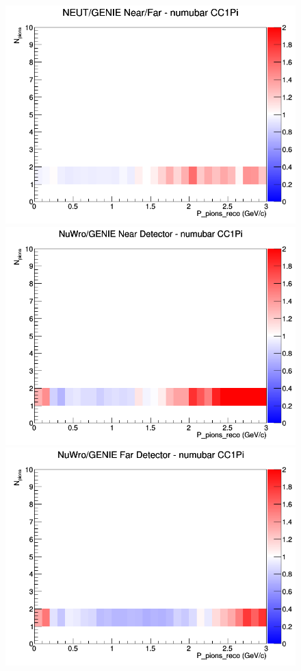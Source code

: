 \documentclass[12pt]{article}
\begin{document}
\begin{figure}[h]
\endminipage
{}
\includegraphics[width=\linewidth]{eff_N_P/LAr/pions/ratios/CC1Pi_NEUT_GENIE_numubar_NF_N_P.png}
\endminipage
\newline
{}
\includegraphics[width=\linewidth]{eff_N_P/LAr/pions/ratios/CC1Pi_NuWro_GENIE_numubar_near_N_P.png}
\endminipage
{}
\includegraphics[width=\linewidth]{eff_N_P/LAr/pions/ratios/CC1Pi_NuWro_GENIE_numubar_far_N_P.png}

\end{figure}
\end{document}
